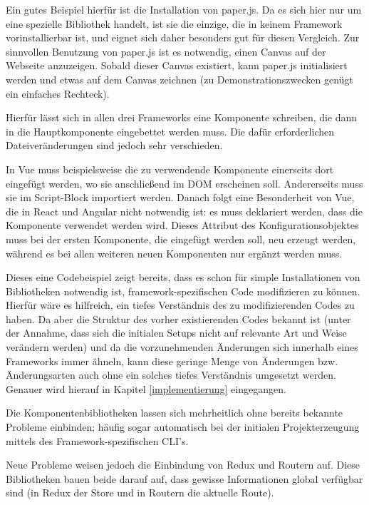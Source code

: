 Ein gutes Beispiel hierfür ist die Installation von paper.js. Da es sich hier nur um eine spezielle Bibliothek handelt, ist sie die einzige, die in keinem Framework vorinstallierbar ist, und eignet sich daher besonders gut für diesen Vergleich. Zur sinnvollen Benutzung von paper.js ist es notwendig, einen Canvas auf der Webseite anzuzeigen. Sobald dieser Canvas existiert, kann paper.js initialisiert werden und etwas auf dem Canvas zeichnen (zu Demonstrationszwecken genügt ein einfaches Rechteck).

Hierfür lässt sich in allen drei Frameworks eine Komponente schreiben, die dann in die Hauptkomponente eingebettet werden muss. Die dafür erforderlichen Dateiveränderungen sind jedoch sehr verschieden.

In Vue muss beispielsweise die zu verwendende Komponente einerseits dort eingefügt werden, wo sie anschließend im \gls{DOM} erscheinen soll. Andererseits muss sie im Script-Block importiert werden. Danach folgt eine Besonderheit von Vue, die in React und Angular nicht notwendig ist: es muss deklariert werden, dass die Komponente verwendet werden wird. Dieses Attribut des Konfigurationsobjektes muss bei der ersten Komponente, die eingefügt werden soll, neu erzeugt werden, während es bei allen weiteren neuen Komponenten nur ergänzt werden muss.

Dieses eine Codebeispiel zeigt bereits, dass es schon für simple Installationen von Bibliotheken notwendig ist, framework-spezifischen Code modifizieren zu können. Hierfür wäre es hilfreich, ein tiefes Verständnis des zu modifizierenden Codes zu haben. Da aber die Struktur des vorher existierenden Codes bekannt ist (unter der Annahme, dass sich die initialen Setups nicht auf relevante Art und Weise verändern werden) und da die vorzunehmenden Änderungen sich innerhalb eines Frameworks immer ähneln, kann diese geringe Menge von Änderungen bzw. Änderungsarten auch ohne ein solches tiefes Verständnis umgesetzt werden. Genauer wird hierauf in Kapitel \ref{implementierung} eingegangen.

Die Komponentenbibliotheken lassen sich mehrheitlich ohne bereits bekannte Probleme einbinden; häufig sogar automatisch bei der initialen Projekterzeugung mittels des Framework-spezifischen \gls{CLI}'s.

Neue Probleme weisen jedoch die Einbindung von Redux und Routern auf. Diese Bibliotheken bauen beide darauf auf, dass gewisse Informationen global verfügbar sind (in Redux der Store und in Routern die aktuelle Route).

